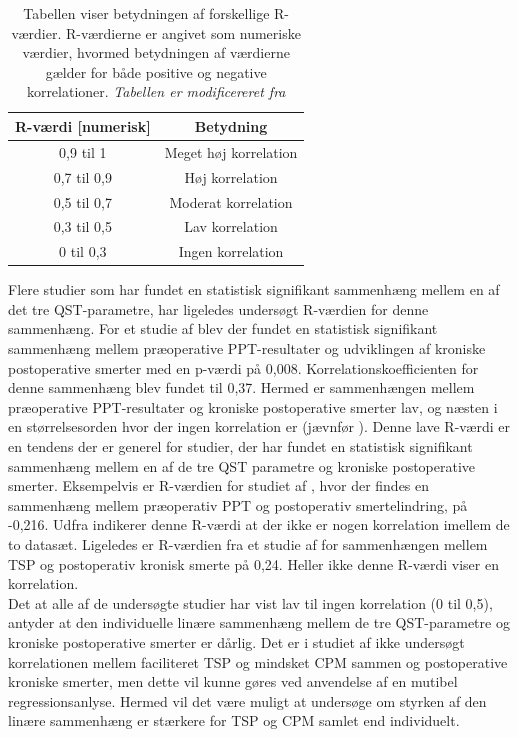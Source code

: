 \begin{table}[H]
\centering
\begin{tabular}{cc}
\rowcolor[HTML]{C0C0C0} 
R-værdi {[}numerisk{]} & Betydning  \\ \hline
0,9 til 1              & Meget høj korrelation              \\
0,7 til 0,9            & Høj korrelation                    \\
0,5 til 0,7            & Moderat korrelation                \\
0,3 til 0,5            & Lav korrelation                    \\
0 til 0,3              & Ingen korrelation                  \\ \hline
\end{tabular}
\caption{Tabellen viser betydningen af forskellige R-værdier. R-værdierne er angivet som numeriske værdier, hvormed betydningen af værdierne gælder for både positive og negative korrelationer. \textit{Tabellen er modificereret fra }}
\label{tab:styrke_r}
\end{table}

Flere studier som har fundet en statistisk signifikant sammenhæng mellem en af det tre QST-parametre, har ligeledes undersøgt R-værdien for denne sammenhæng. For et studie af  blev der fundet en statistisk signifikant sammenhæng mellem præoperative PPT-resultater og udviklingen af kroniske postoperative smerter med en p-værdi på 0,008. Korrelationskoefficienten for denne sammenhæng blev fundet til 0,37. Hermed er sammenhængen mellem præoperative PPT-resultater og kroniske postoperative smerter lav, og næsten i en størrelsesorden hvor der ingen korrelation er (jævnfør ). Denne lave R-værdi er en tendens der er generel for studier, der har fundet en statistisk signifikant sammenhæng mellem en af de tre QST parametre og kroniske postoperative smerter. Eksempelvis er R-værdien for studiet af , hvor der findes en sammenhæng mellem præoperativ PPT og postoperativ smertelindring, på -0,216. Udfra  indikerer denne R-værdi at der ikke er nogen korrelation imellem de to datasæt. Ligeledes er R-værdien fra et studie af  for sammenhængen mellem TSP og postoperativ kronisk smerte på 0,24. Heller ikke denne R-værdi viser en korrelation. \\
Det at alle af de undersøgte studier har vist lav til ingen korrelation (0 til 0,5), antyder at den individuelle linære sammenhæng mellem de tre QST-parametre og kroniske postoperative smerter er dårlig. Det er i studiet af  ikke undersøgt korrelationen mellem faciliteret TSP og mindsket CPM sammen og postoperative kroniske smerter, men dette vil kunne gøres ved anvendelse af en mutibel regressionsanlyse. \citep{Zar2010} Hermed vil det være muligt at undersøge om styrken af den linære sammenhæng er stærkere for TSP og CPM samlet end individuelt.

